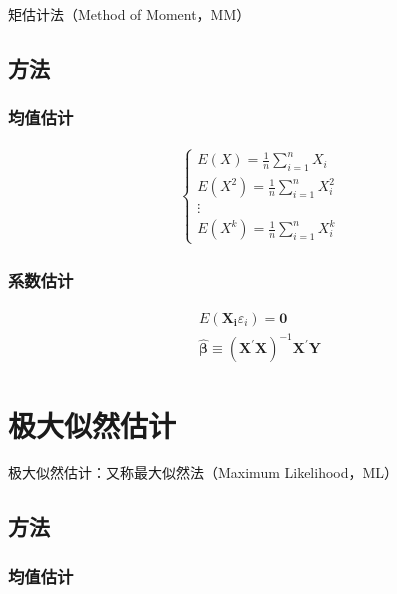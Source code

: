 \documentclass[12pt]{book}
\begin{document}
矩估计法（Method of Moment，MM）

\subsection{方法}

\subsubsection{均值估计}

\begin{gather*}
    \begin{cases}
        E(X) = \frac{1}{n}\sum_{i=1}^{n}{X_i}     \\
        E(X^2) = \frac{1}{n}\sum_{i=1}^{n}{X_i^2} \\
        \vdots                                    \\
        E(X^k) = \frac{1}{n}\sum_{i=1}^{n}{X_i^k}
    \end{cases}
\end{gather*}

\subsubsection{系数估计}

\begin{gather*}
    E( \mathbf{X_i} \varepsilon_{i} ) =\mathbf{0} \\
    \hat{\bm{\beta}} \equiv  (\mathbf{X}^{\prime}\mathbf{X})^{-1} \mathbf{X}^{\prime} \mathbf{Y}
\end{gather*}










\section{极大似然估计}







极大似然估计：又称最大似然法（Maximum Likelihood，ML）

\subsection{方法}
\subsubsection{均值估计}
\end{document}
